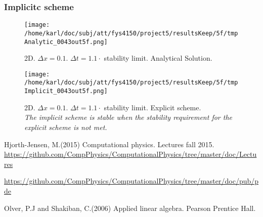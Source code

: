 \documentclass{article}
\begin{document}
\subsubsection{Implicitc scheme}
\begin{minipage}{.45\textwidth} 
	\begin{figure}[H]
		\centering
		\texttt{[image: /home/karl/doc/subj/att/fys4150/project5/resultsKeep/5f/tmpAnalytic\_0043out5f.png]}
		\caption{2D. $\Delta x = 0.1$. $\Delta t = 1.1 \cdot$ stability limit.  Analytical Solution.\\ \textit{}}
		\label{fig:fig2d8}
	\end{figure}
\end{minipage}\hfill
\begin{minipage}{.45\textwidth} 
	\begin{figure}[H]
		\centering
		\texttt{[image: /home/karl/doc/subj/att/fys4150/project5/resultsKeep/5f/tmpImplicit\_0043out5f.png]}
		\caption{2D. $\Delta x = 0.1$. $\Delta t = 1.1 \cdot$ stability limit.  Explicit scheme.\\ \textit{The implicit scheme is stable when the stability requirement for the explicit scheme is not met.}}
		\label{fig:fig2d9}
	\end{figure}
\end{minipage}\hfill
\vspace{2ex}




\begin{thebibliography}{9}
	Hjorth-Jensen, M.(2015)
	Computational physics. Lectures fall 2015. 
	\url{https://github.com/CompPhysics/ComputationalPhysics/tree/master/doc/Lectures}
	
	\url{https://github.com/CompPhysics/ComputationalPhysics/tree/master/doc/pub/pde}
	
	Olver, P.J and Shakiban, C.(2006)
	Applied linear algebra. Pearson Prentice Hall. 

\end{thebibliography}
\end{document}
